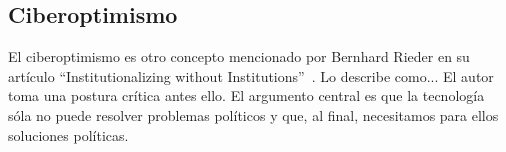 \subsection{Ciberoptimismo}

El ciberoptimismo es otro concepto mencionado por Bernhard Rieder en su artículo ``Institutionalizing without Institutions''~\autocite{Rieder2012}.
Lo describe como...
El autor toma una postura crítica antes ello.
El argumento central es que la tecnología sóla no puede resolver problemas políticos y que, al final, necesitamos para ellos soluciones políticas.


\begin{comment}
[Rieder2012]

"The central point that I have tried to make over these pages is that the major fault of contempo-
rary cyber-optimism is perhaps not simply its technological determinism, but a tendency towards
an essentialist view of both technology and democracy that eschews the complexities and deep
contradictions that characterize both." (Schlussfolgerung)

"One of the most common claims frames the Internet as a force of democratization. Appearing
recently in conjunction with the “Web 2.0” phenomenon, it portrays network technology as an
agent of decentralization that will bring an end to cultural hierarchies"
Idealerweise: Bildungsauftrag, Empowerment, aber in der Realitaet wenige verstehen wirklich was da so geht und deshalb bleibt die Arbeit auch an einigen wenigen Menschen haengen.

"In this “cyber-optimistic” viewpoint, the Internet is the agent of a
“capillary revolution” that is set to bring decentralization, equality, and democracy."

"the Internet allows capillary configurations
of power – local initiatives, ad-hoc pressure groups, fan cultures, “issue publics” – to challenge
the statutory powers that be. "
Allerdings:
Wird argumentiert, dass alle mitmachen koennen, das stimmt aber nicth so direkt.
Koloniale Zusammenhaenge bestehen;
Geographische Schwierigkeiten;
Oekonom. Probleme (oft in Kombi mit schwierigem Terrain); --> Kommerzielle Provider haben kein Interesse
Staatliche Repression --> dem Staat passt nicht dass X oder Y kommunizieren kann und eine oeffentliche Plattform hat

"while for communitarians the digital world mir-
rors the values of egalitarian forms of direct democracy and grassroots networking.” (Norris
2001, p. 232)"


\end{comment}

